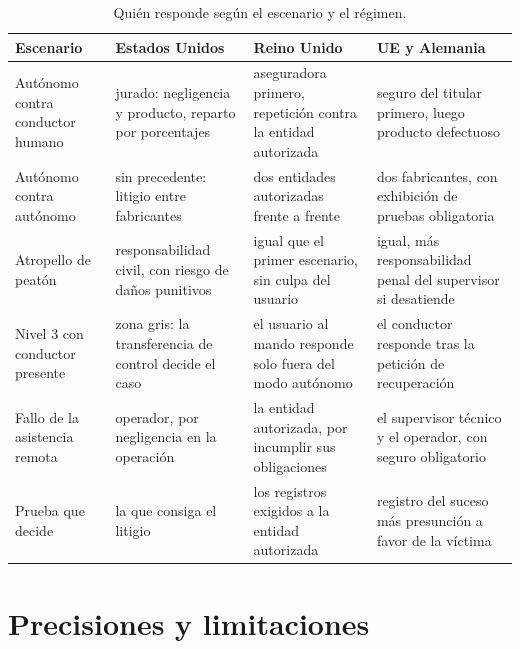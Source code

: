 \documentclass[11pt,letterpaper]{article}
\begin{document}
\begin{table}[tbp]
  \centering
  \small
  \caption{Quién responde según el escenario y el régimen.}
  \label{tab:matriz}
  \begin{tabularx}{\textwidth}{@{}>{\raggedright\arraybackslash}p{}
    >{\raggedright\arraybackslash}X >{\raggedright\arraybackslash}X
    >{\raggedright\arraybackslash}X@{}}
    \toprule
    \textbf{Escenario} & \textbf{Estados Unidos} & \textbf{Reino Unido}
      & \textbf{UE y Alemania} \\
    \midrule
    Autónomo contra conductor humano
      & jurado: negligencia y producto, reparto por porcentajes
      & aseguradora primero, repetición contra la entidad autorizada
      & seguro del titular primero, luego producto defectuoso \\
    Autónomo contra autónomo
      & sin precedente: litigio entre fabricantes
      & dos entidades autorizadas frente a frente
      & dos fabricantes, con exhibición de pruebas obligatoria \\
    Atropello de peatón
      & responsabilidad civil, con riesgo de daños punitivos
      & igual que el primer escenario, sin culpa del usuario
      & igual, más responsabilidad penal del supervisor si desatiende \\
    Nivel 3 con conductor presente
      & zona gris: la transferencia de control decide el caso
      & el usuario al mando responde solo fuera del modo autónomo
      & el conductor responde tras la petición de recuperación \\
    Fallo de la asistencia remota
      & operador, por negligencia en la operación
      & la entidad autorizada, por incumplir sus obligaciones
      & el supervisor técnico y el operador, con seguro obligatorio \\
    Prueba que decide
      & la que consiga el litigio
      & los registros exigidos a la entidad autorizada
      & registro del suceso más presunción a favor de la víctima \\
    \bottomrule
  \end{tabularx}
\end{table}

\section{Precisiones y limitaciones}
\end{document}
